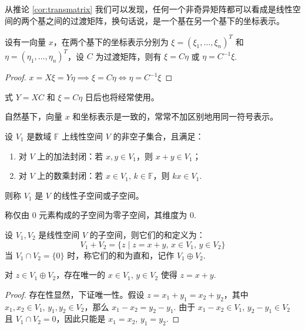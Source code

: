 \begin{com}
从推论 \ref{cor:transmatrix} 我们可以发现，任何一个非奇异矩阵都可以看成是线性空间的两个基之间的过渡矩阵，换句话说，是一个基在另一个基下的坐标表示。
\end{com}

\begin{theorem}[向量在不同基下的表示坐标的关系]
设有一向量 $x$，在两个基下的坐标表示分别为 $\xi=(\xi_1,\ldots,\xi_n)^T$ 和 $\eta=(\eta_1,\ldots,\eta_n)^T$，设 $C$ 为过渡矩阵，则有 $\xi=C\eta$ 或 $\eta=C^{-1}\xi$.
\end{theorem}
\begin{proof}
$x=X\xi=Y\eta\implies\xi=C\eta\iff\eta=C^{-1}\xi$
\end{proof}

\begin{remark}
式 $Y=XC$ 和 $\xi=C\eta$ 日后也将经常使用。
\end{remark}

\begin{com}
自然基下，向量 $x$ 和坐标表示是一致的，常常不加区别地用同一符号表示。
\end{com}

\begin{definition}[线性子空间]
设 $V_1$ 是数域 $\mathbb F$ 上线性空间 $V$ 的非空子集合，且满足：
\begin{enumerate}
    \item 对 $V$ 上的加法封闭：若 $x,y\in V_1$，则 $x+y\in V_1$；
    \item 对 $V$ 上的数乘封闭：若 $x\in V_1,\,k\in \mathbb F$，则 $kx\in V_1$.
\end{enumerate}
则称 $V_1$ 是 $V$ 的线性子空间或子空间。
\end{definition}

\begin{definition}[零子空间]
称仅由 $0$ 元素构成的子空间为零子空间，其维度为 0.
\end{definition}

\begin{definition}[子空间的和与直和]
设 $V_1,V_2$ 是线性空间 $V$ 的子空间，则它们的和定义为：
\[
    V_1+V_2=\{z\mid z=x+y,\,x\in V_1,\,y\in V_2\}
\]
当 $V_1\cap V_2=\{0\}$ 时，称它们的和为直和，记作 $V_1\oplus V_2$.
\end{definition}

\begin{property}[直和]
对 $z\in V_1\oplus V_2$，存在唯一的 $x\in V_1,\,y\in V_2$ 使得 $z=x+y$.
\end{property}
\begin{proof}
存在性显然，下证唯一性。假设 $z=x_1+y_1=x_2+y_2$，其中 $x_1,x_2\in V_1,\,y_1,y_2\in V_2$，那么 $x_1-x_2=y_2-y_1$. 由于 $x_1-x_2\in V_1,\,y_2-y_1\in V_2$ 且 $V_1\cap V_2=0$，因此只能是 $x_1=x_2,\,y_1=y_2$.
\end{proof}

